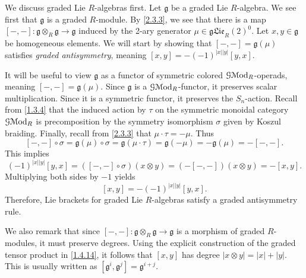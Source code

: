 \begin{discussion}\label{2.3.9}
	We discuss graded Lie $R$-algebras first. Let $\mathfrak{g} $ be a graded Lie $R$-algebra. We see first that $\mathfrak{g} $ is a graded $R$-module. By \cref{2.3.3}, we see that there is a map $[-,-]: \mathfrak{g} \otimes _R\mathfrak{g}  \to \mathfrak{g} $ induced by the 2-ary generator $\mu \in \mathfrak{gLie}_R(2)^0$. Let $x,y\in \mathfrak{g} $ be homogeneous elements. We will start by showing that $[-,-]=\mathfrak{g} (\mu )$ satisfies \emph{graded antisymmetry}, meaning $[x,y]=-(-1)^{\left| x \right| \left| y \right| } [y,x]$.

	It will be useful to view $\mathfrak{g} $ as a functor of symmetric colored $\mathcal{G}\mathcal{M}\mathrm{od} _R$-operads, meaning $[-,-]=\mathfrak{g} (\mu )$. Since $\mathfrak{g} $ is a $\mathcal{G}\mathcal{M}\mathrm{od} _R$-functor, it preserves scalar multiplication. Since it is a symmetric functor, it preserves the $S_n$-action. Recall from \cref{1.3.4} that the induced action by $\tau $ on the symmetric monoidal category $\mathcal{G} \mathcal{M}\mathrm{od} _R$ is precomposition by the symmetry isomorphism $\sigma $ given by Koszul braiding. Finally, recall from \cref{2.3.3} that $\mu \cdot \tau =-\mu $. Thus
	\[
		[-,-]\circ \sigma =\mathfrak{g} (\mu )\circ \sigma =\mathfrak{g} (\mu \cdot \tau )=\mathfrak{g} (-\mu )=-\mathfrak{g} (\mu )=-[-,-]
	.\]
	This implies
	\[
		(-1)^{\left| x \right| \left| y \right| } [y,x] =([-,-]\circ \sigma )(x\otimes y) =(-[-,-])(x\otimes y) = -[x,y]
	.\]
	Multiplying both sides by $-1$ yields
	\[
		[x,y]=-(-1)^{\left| x \right| \left| y \right| } [y,x]
	.\]
	Therefore, Lie brackets for graded Lie $R$-algebras satisfy a graded antisymmetry rule.

	We also remark that since $[-,-]: \mathfrak{g} \otimes _R\mathfrak{g}  \to \mathfrak{g} $ is a morphism of graded $R$-modules, it must preserve degrees. Using the explicit construction of the graded tensor product in \cref{1.4.14}, it follows that $[x,y]$ has degree $\left| x\otimes y \right| =\left| x \right| +\left| y \right| $. This is usually written as $[\mathfrak{g} ^i,\mathfrak{g} ^j]=\mathfrak{g} ^{i+j} $.


\end{discussion}
